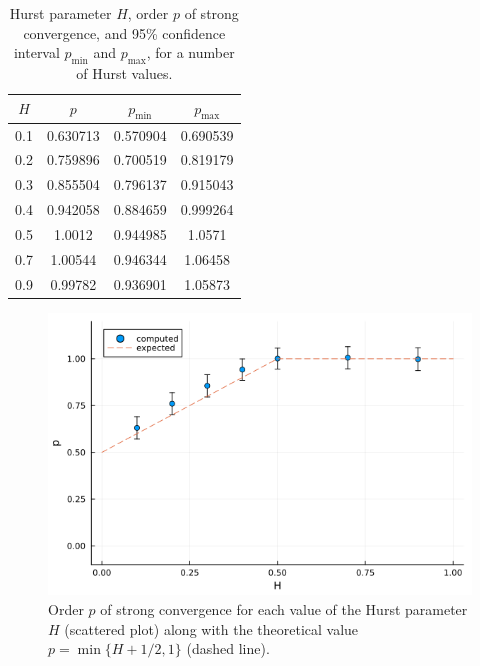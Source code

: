 \documentclass[reqno,12pt]{amsart}
\theoremstyle{plain} %
\theoremstyle{definition} %
\begin{document}
\begin{table}
    \begin{tabular}[htb]{|c|c|c|c|}
        \hline $H$ & $p$ & $p_{\textrm{min}}$ & $p_{\textrm{max}}$ \\
        \hline \hline
        0.1 & 0.630713 & 0.570904 & 0.690539 \\
        0.2 & 0.759896 & 0.700519 & 0.819179 \\
        0.3 & 0.855504 & 0.796137 & 0.915043 \\
        0.4 & 0.942058 & 0.884659 & 0.999264 \\
        0.5 & 1.0012   & 0.944985 & 1.0571 \\
        0.7 & 1.00544  & 0.946344 & 1.06458 \\
        0.9 & 0.99782  & 0.936901 & 1.05873 \\
        \hline
    \end{tabular}
    \bigskip

    \caption{Hurst parameter $H$, order $p$ of strong convergence, and 95\% confidence interval $p_{\textrm{min}}$ and $p_{\textrm{max}}$, for a number of Hurst values.}
    \label{taborderdepHfBm}
\end{table}

\begin{figure}[htb]
    \includegraphics[scale=0.4]{img/order_dep_on_H_fBm.png}
    \caption{Order $p$ of strong convergence for each value of the Hurst parameter $H$ (scattered plot) along with the theoretical value $p=\min\{H + 1/2, 1\}$ (dashed line).}
    \label{figorderdepHfBm}
\end{figure}
\end{document}
